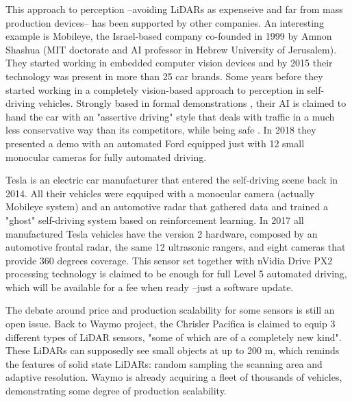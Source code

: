 This approach to perception --avoiding LiDARs as expenseive and far from mass
production devices-- has been supported by other companies. An interesting 
example is Mobileye, the Israel-based company co-founded in 1999 by Amnon 
Shashua (MIT doctorate and AI professor in Hebrew University of Jerusalem).
They started working in embedded computer vision devices and by 2015 their 
technology was present in more than 25 car brands. Some years before they
started working in a completely vision-based approach to perception in 
self-driving vehicles. Strongly based in formal demonstrations 
\cite{Shalev-Shwartz2017}, their AI is claimed to hand the car with an 
"assertive driving" style that deals with traffic in a much less
conservative way than its competitors, while being safe 
\cite{Shalev-shwartz2016}. 
In 2018 they presented a demo with an automated Ford equipped just with 
12 small monocular cameras for fully automated driving.

Tesla is an electric car manufacturer that entered the self-driving scene back
in 2014. All their vehicles were eqquiped with a monocular camera (actually
Mobileye system) and an automotive radar that gathered data and trained a
"ghost" self-driving system based on reinforcement learning. In 2017 all 
manufactured Tesla vehicles have the version 2 hardware, composed by an
automotive frontal radar, the same 12 ultrasonic rangers, and eight cameras 
that provide 360 degrees coverage. This sensor set together with nVidia
Drive PX2 processing technology is claimed to be enough for full Level 5 
automated driving, which will be available for a fee when ready --just a 
software update.

The debate around price and production scalability for some sensors is still
an open issue. Back to Waymo project, the Chrisler Pacifica is claimed to
equip 3 different types of LiDAR sensors, "some of which are of a completely
new kind". These LiDARs can supposedly see small objects at up to 200 m, 
which reminds the features of solid state LiDARs: random sampling the scanning 
area and adaptive resolution. Waymo is already acquiring a fleet of thousands 
of vehicles, demonstrating some degree of production scalability.


